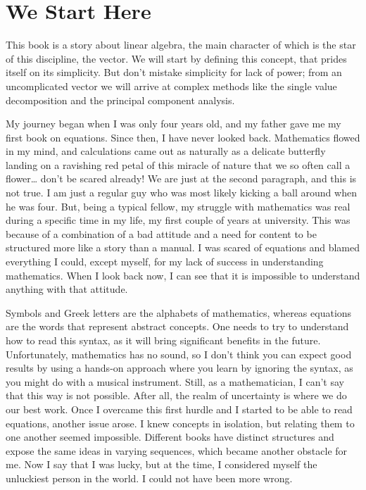 \documentclass[a4,12pt,twosided,openany]{memoir}
\begin{document}


\chapter{We Start Here}
\thispagestyle{empty}
\par 
\indent
This book is a story about linear algebra, the main character of which is the star of this discipline, the vector. We will start by defining this concept, that prides itself on its simplicity. But don’t mistake simplicity for lack of power; from an uncomplicated vector we will arrive at complex methods like the single value decomposition and the principal component analysis.
\par 
\indent
My journey began when I was only four years old, and my father gave me my first book on equations. Since then, I have never looked back. Mathematics flowed in my mind, and calculations came out as naturally as a delicate butterfly landing on a ravishing red petal of this miracle of nature that we so often call a flower… don’t be scared already! We are just at the second paragraph, and this is not true. I am just a regular guy who was most likely kicking a ball around when he was four. But, being a typical fellow, my struggle with mathematics was real during a specific time in my life, my first couple of years at university. This was because of a combination of a bad attitude and a need for content to be structured more like a story than a manual. I was scared of equations and blamed everything I could, except myself, for my lack of success in understanding mathematics. When I look back now, I can see that it is impossible to understand anything with that attitude.
\par 
\indent
Symbols and Greek letters are the alphabets of mathematics, whereas equations are the words that represent abstract concepts. One needs to try to understand how to read this syntax, as it will bring significant benefits in the future. Unfortunately, mathematics has no sound, so I don’t think you can expect good results by using a hands-on approach where you learn by ignoring the syntax, as you might do with a musical instrument. Still, as a mathematician, I can’t say that this way is not possible. After all, the realm of uncertainty is where we do our best work. Once I overcame this first hurdle and I started to be able to read equations, another issue arose. I knew concepts in isolation, but relating them to one another seemed impossible. Different books have distinct structures and expose the same ideas in varying sequences, which became another obstacle for me. Now I say that I was lucky, but at the time, I considered myself the unluckiest person in the world. I could not have been more wrong.
\end{document}
